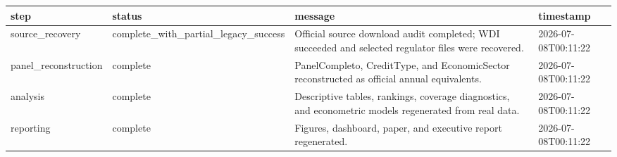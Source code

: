 ﻿%
\begin{tabular}{llll}
\hline
step & status & message & timestamp \\
\hline
source\_recovery & complete\_with\_partial\_legacy\_success & Official source download audit completed; WDI succeeded and selected regulator files were recovered. & 2026-07-08T00:11:22 \\
panel\_reconstruction & complete & PanelCompleto, CreditType, and EconomicSector reconstructed as official annual equivalents. & 2026-07-08T00:11:22 \\
analysis & complete & Descriptive tables, rankings, coverage diagnostics, and econometric models regenerated from real data. & 2026-07-08T00:11:22 \\
reporting & complete & Figures, dashboard, paper, and executive report regenerated. & 2026-07-08T00:11:22 \\
\hline
\end{tabular}

